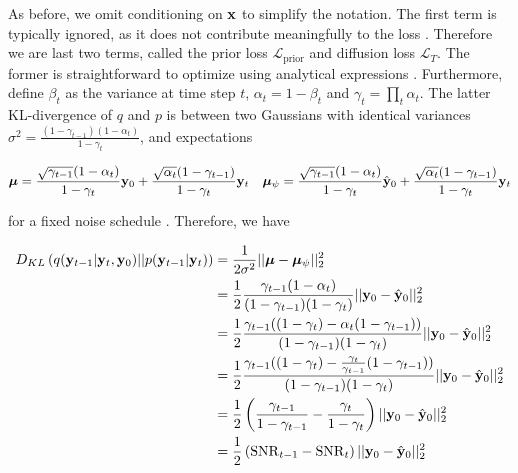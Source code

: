 As before, we omit conditioning on $\bold{x}$ to simplify the notation. The first term is typically ignored, as it does not contribute meaningfully to the loss \parencite{Ribeiro2024}. Therefore we are last two terms, called the prior loss $\mathcal{L}_{\mathrm{prior}}$ and diffusion loss $\mathcal{L}_{T}$. The former is straightforward to optimize using analytical expressions \parencite{Maggiora2023}. Furthermore, define $\beta_{t}$ as the variance at time step $t$, $\alpha_{t}=1-\beta_{t}$ and $\gamma_{t}=\prod_{t}\alpha_{t}$. The latter KL-divergence of $q$ and $p$ is between two Gaussians with identical variances $\sigma^{2} = \frac{(1-\gamma_{t-1})(1-\alpha_{t})}{1-\gamma_{t}}$, and expectations

\begin{align*}
\boldsymbol{\mu} = \frac{\sqrt{\gamma_{t-1}}(1-\alpha_{t})}{1-\gamma_{t}}\bold{y}_{0}+ \frac{\sqrt{\alpha_{t}}(1-\gamma_{t-1})}{{1-\gamma_{t}}}\bold{y}_{t} \quad \boldsymbol{\mu}_{\psi} = \frac{\sqrt{\gamma_{t-1}}(1-\alpha_{t})}{1-\gamma_{t}}\hat{\bold{y}}_{0}+ \frac{\sqrt{\alpha_{t}}(1-\gamma_{t-1})}{{1-\gamma_{t}}}\bold{y}_{t}
\end{align*}

for a fixed noise schedule \parencite{Saharia2021}. Therefore, we have

\begin{align*}
D_{KL}\left(q(\bold{y}_{t-1}\lvert\bold{y}_t,\bold{y}_0)\lvert\lvert p(\bold{y}_{t-1}\lvert\bold{y}_t) \right) &= \frac{1}{2\sigma^{2}} \lvert\lvert \boldsymbol{\mu} - \boldsymbol{\mu}_{\psi} \lvert\lvert_{2}^{2} \\
&= \frac{1}{2}\frac{\gamma_{t-1}(1-\alpha_{t})}{(1-\gamma_{t-1})(1-\gamma_{t})}\lvert\lvert \bold{y}_{0} - \hat{\bold{y}}_{0} \lvert\lvert_{2}^{2}\\
&= \frac{1}{2}\frac{\gamma_{t-1}((1-\gamma_{t})-\alpha_{t}(1-\gamma_{t-1}))}{(1-\gamma_{t-1})(1-\gamma_{t})}\lvert\lvert \bold{y}_{0} - \hat{\bold{y}}_{0} \lvert\lvert_{2}^{2}\\
&= \frac{1}{2}\frac{\gamma_{t-1}((1-\gamma_{t})-\frac{\gamma_{t}}{\gamma_{t-1}}(1-\gamma_{t-1}))}{(1-\gamma_{t-1})(1-\gamma_{t})}\lvert\lvert \bold{y}_{0} - \hat{\bold{y}}_{0} \lvert\lvert_{2}^{2}\\
&= \frac{1}{2}\left(\frac{\gamma_{t-1}}{1-\gamma_{t-1}}-\frac{\gamma_{t}}{1-\gamma_{t}}\right)\lvert\lvert \bold{y}_{0} - \hat{\bold{y}}_{0} \lvert\lvert_{2}^{2}\\
&= \frac{1}{2}\left(\mathrm{SNR}_{t-1}-\mathrm{SNR}_{t}\right)\lvert\lvert \bold{y}_{0} - \hat{\bold{y}}_{0} \lvert\lvert_{2}^{2}
\end{align*}

